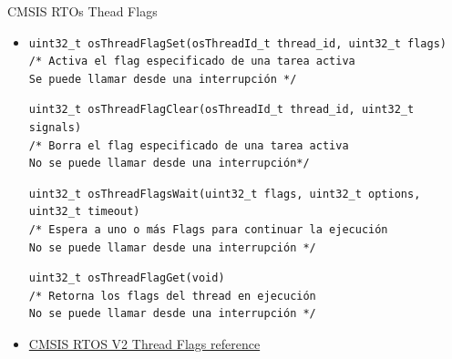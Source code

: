 \begin{frame}[fragile]{CMSIS RTOs Thead Flags}

    \begin{itemize}
        \item []
         \begin{verbatim}
uint32_t osThreadFlagSet(osThreadId_t thread_id, uint32_t flags)
/* Activa el flag especificado de una tarea activa
Se puede llamar desde una interrupción */

         \end{verbatim}
         \begin{verbatim}
uint32_t osThreadFlagClear(osThreadId_t thread_id, uint32_t signals)
/* Borra el flag especificado de una tarea activa
No se puede llamar desde una interrupción*/

         \end{verbatim}
         \begin{verbatim}
uint32_t osThreadFlagsWait(uint32_t flags, uint32_t options, uint32_t timeout)
/* Espera a uno o más Flags para continuar la ejecución
No se puede llamar desde una interrupción */

         \end{verbatim}
         \begin{verbatim}
uint32_t osThreadFlagGet(void)
/* Retorna los flags del thread en ejecución 
No se puede llamar desde una interrupción */

         \end{verbatim}      
         \item[] \href{https://arm-software.github.io/CMSIS_5/RTOS2/html/group__CMSIS__RTOS__ThreadFlagsMgmt.html}{CMSIS RTOS V2 Thread Flags reference}
    \end{itemize}     
\end{frame}

